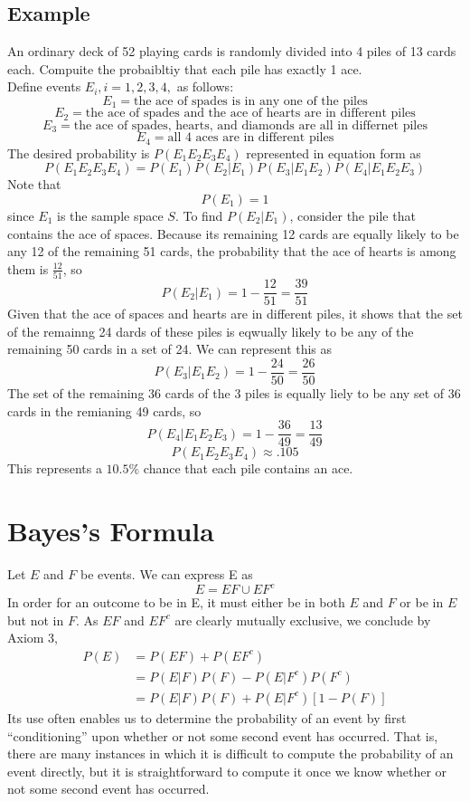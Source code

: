 \subsection*{Example}
An ordinary deck of 52 playing cards is randomly divided into 4 piles of 13 cards each. Compuite the probaibltiy that each pile has exactly 1 ace. \\
Define events $E_i, i = 1,2,3,4,$ as follows:
\[E_1 = {\text{the ace of spades is in any one of the piles}}\]
\[E_2 = {\text{the ace of spades and the ace of hearts are in different piles}}\]
\[E_3 = {\text{the ace of spades, hearts, and diamonds are all in differnet piles}}\]
\[E_4 = {\text{all 4 aces are in different piles}}\]
The desired probability is $P(E_1E_2E_3E_4)$ represented in equation form as
\[P(E_1E_2E_3E_4) = P(E_1)P(E_2|E_1)P(E_3|E_1E_2)P(E_4|E_1E_2E_3)\]
Note that \[P(E_1) = 1\] since $E_1$ is the sample space $S$. To find $P(E_2|E_1)$, consider the pile that contains the ace of spaces. Because its remaining 12 cards are equally likely to be any 12 of the remaining 51 cards, the probability that the ace of hearts is among them is $\frac{12}{51}$, so
\[P(E_2|E_1) = 1 - \frac{12}{51} = \frac{39}{51}\]
Given that the ace of spaces and hearts are in different piles, it shows that the set of the remainng 24 dards of these piles is eqwually likely to be any of the remaining 50 cards in a set of 24. We can represent this as \[P(E_3|E_1E_2) = 1 - \frac{24}{50} = \frac{26}{50}\]
The set of the remaining 36 cards of the 3 piles is equally liely to be any set of 36 cards in the remianing 49 cards, so \[P(E_4|E_1E_2E_3) = 1 - \frac{36}{49} = \frac{13}{49}\]
\[P(E_1E_2E_3E_4)\approx .105\]
This represents a $10.5\%$ chance that each pile contains an ace. 
\section{Bayes's Formula}
Let $E$ and $F$ be events. We can express E as \[E = EF\cup EF^c\]
In order for an outcome to be in E, it must either be in both $E$ and $F$ or be in $E$ but not in $F$. As $EF$ and $EF^c$ are clearly mutually exclusive, we conclude by Axiom 3, 
\begin{equation}\label{eqn: Bayes's Formula}
    \begin{split}
        P(E) & = P(EF) + P(EF^c)\\
        & = P(E|F)P(F) - P(E|F^c)P(F^c)\\
        & = P(E|F)P(F) + P(E|F^c)[1-P(F)]
    \end{split}\tag{Bayes's Formula}
\end{equation}
Its use often enables us to determine the probability of an event by first “conditioning” upon whether or not some second event has occurred. That is, there are many instances in which it is difficult to compute the probability of an event directly, but it is straightforward to compute it once we know whether or not some second event has occurred.
\begin{theorem}
    
\end{theorem}
